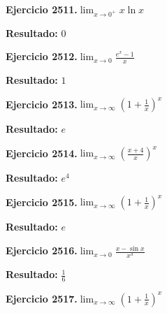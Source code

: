 \documentclass[10pt,a4paper]{article}
\begin{document}
\newpage
\begin{ejbox}
\textbf{Ejercicio 2511.}\quad $\lim_{x\to 0^+} x\ln x$
\end{ejbox}

\begin{solbox}
\textbf{Resultado:} \(\displaystyle 0\)
\end{solbox}

\begin{ejbox}
\textbf{Ejercicio 2512.}\quad $\lim_{x\to 0} \frac{e^x-1}{x}$
\end{ejbox}

\begin{solbox}
\textbf{Resultado:} \(\displaystyle 1\)
\end{solbox}

\begin{ejbox}
\textbf{Ejercicio 2513.}\quad $\lim_{x\to \infty} \left(1+\frac{1}{x}\right)^x$
\end{ejbox}

\begin{solbox}
\textbf{Resultado:} \(\displaystyle e\)
\end{solbox}

\newpage
\begin{ejbox}
\textbf{Ejercicio 2514.}\quad $\lim_{x\to \infty} \left(\frac{x+4}{x}\right)^{x}$
\end{ejbox}

\begin{solbox}
\textbf{Resultado:} \(\displaystyle e^{4}\)
\end{solbox}

\begin{ejbox}
\textbf{Ejercicio 2515.}\quad $\lim_{x\to \infty} \left(1+\frac{1}{x}\right)^x$
\end{ejbox}

\begin{solbox}
\textbf{Resultado:} \(\displaystyle e\)
\end{solbox}

\begin{ejbox}
\textbf{Ejercicio 2516.}\quad $\lim_{x\to 0} \frac{x-\sin x}{x^3}$
\end{ejbox}

\begin{solbox}
\textbf{Resultado:} \(\displaystyle \frac{1}{6}\)
\end{solbox}

\newpage
\begin{ejbox}
\textbf{Ejercicio 2517.}\quad $\lim_{x\to \infty} \left(1+\frac{1}{x}\right)^x$
\end{ejbox}
\end{document}
